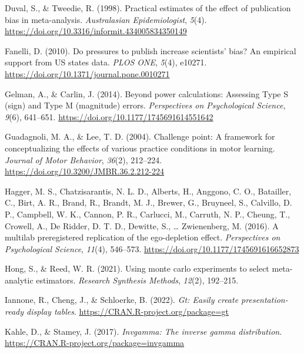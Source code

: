 \documentclass[
  man, donotrepeattitle,floatsintext]{apa7}
\newlength{\cslhangindent}
\newlength{\cslentryspacingunit} %
\newenvironment{CSLReferences}[2] %
 {%
  \setlength{\parindent}{0pt}
  \ifodd #1
  \let\oldpar\par
  \def\par{\hangindent=\cslhangindent\oldpar}
  \fi
  \setlength{\parskip}{#2\cslentryspacingunit}
 }%
 {}
\begin{document}
\begin{CSLReferences}{1}{0}
\leavevmode{}%
Duval, S., \& Tweedie, R. (1998). Practical estimates of the effect of publication bias in meta-analysis. \emph{Australasian Epidemiologist}, \emph{5}(4). \url{https://doi.org/10.3316/informit.434005834350149}

\leavevmode{}%
Fanelli, D. (2010). Do pressures to publish increase scientists' bias? An empirical support from US states data. \emph{PLOS ONE}, \emph{5}(4), e10271. \url{https://doi.org/10.1371/journal.pone.0010271}

\leavevmode{}%
Gelman, A., \& Carlin, J. (2014). Beyond power calculations: {Assessing Type S} (sign) and {Type M} (magnitude) errors. \emph{Perspectives on Psychological Science}, \emph{9}(6), 641--651. \url{https://doi.org/10.1177/1745691614551642}

\leavevmode{}%
Guadagnoli, M. A., \& Lee, T. D. (2004). Challenge point: A framework for conceptualizing the effects of various practice conditions in motor learning. \emph{Journal of Motor Behavior}, \emph{36}(2), 212--224. \url{https://doi.org/10.3200/JMBR.36.2.212-224}

\leavevmode{}%
Hagger, M. S., Chatzisarantis, N. L. D., Alberts, H., Anggono, C. O., Batailler, C., Birt, A. R., Brand, R., Brandt, M. J., Brewer, G., Bruyneel, S., Calvillo, D. P., Campbell, W. K., Cannon, P. R., Carlucci, M., Carruth, N. P., Cheung, T., Crowell, A., De Ridder, D. T. D., Dewitte, S., \ldots{} Zwienenberg, M. (2016). A multilab preregistered replication of the ego-depletion effect. \emph{Perspectives on Psychological Science}, \emph{11}(4), 546--573. \url{https://doi.org/10.1177/1745691616652873}

\leavevmode{}%
Hong, S., \& Reed, W. R. (2021). Using monte carlo experiments to select meta-analytic estimators. \emph{Research Synthesis Methods}, \emph{12}(2), 192--215.

\leavevmode{}%
Iannone, R., Cheng, J., \& Schloerke, B. (2022). \emph{Gt: Easily create presentation-ready display tables}. \url{https://CRAN.R-project.org/package=gt}

\leavevmode{}%
Kahle, D., \& Stamey, J. (2017). \emph{Invgamma: The inverse gamma distribution}. \url{https://CRAN.R-project.org/package=invgamma}


\end{CSLReferences}
\end{document}
